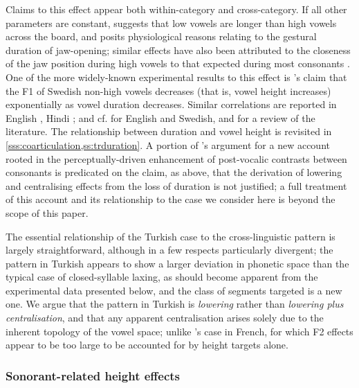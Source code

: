 Claims to this effect appear both within-category and cross-category. If all other parameters are constant, \citet{Lehiste1970} suggests that low vowels are longer than high vowels across the board, and posits physiological reasons relating to the gestural duration of jaw-opening; similar effects have also been attributed to the closeness of the jaw position during high vowels to that expected during most consonants \citep{Maddieson1997,Gussenhoven2007}. One of the more widely-known experimental results to this effect is \cite{Lindblom1963}'s claim that the F1 of Swedish non-high vowels decreases (that is, vowel height increases) exponentially as vowel duration decreases. Similar correlations are reported in English \citep{Peterson1960,Westbury1980}, Hindi \citep{Ohala1992}; and cf. \citet{Toivonen2015} for English and Swedish, and for a review of the literature. The relationship between duration and vowel height is revisited in \cref{sss:coarticulation,ss:trduration}. A portion of \citet{Storme2017ms,Storme2017,Storme2017PhD}'s argument for a new account rooted in the perceptually-driven enhancement of post-vocalic contrasts between consonants is predicated on the claim, as above, that the derivation of lowering and centralising effects from the loss of duration is not justified; a full treatment of this account and its relationship to the case we consider here is beyond the scope of this paper.

The essential relationship of the Turkish case to the cross-linguistic pattern is largely straightforward, although in a few respects particularly divergent; the pattern in Turkish appears to show a larger deviation in phonetic space than the typical case of closed-syllable laxing, as should become apparent from the experimental data presented below, and the class of segments targeted is a new one. We argue that the pattern in Turkish is \emph{lowering} rather than \emph{lowering plus centralisation}, and that any apparent centralisation arises solely due to the inherent topology of the vowel space; unlike \citet[p.~95]{Storme2017PhD}'s case in French, for which F2 effects appear to be too large to be accounted for by height targets alone.

\subsubsection{Sonorant-related height effects}\label{sss:tr_son_effects}


